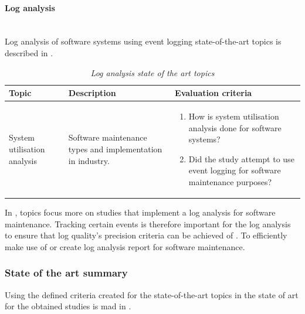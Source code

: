 \clearpage

\paragraph{Log analysis} \leavevmode\\
Log analysis of software systems using event logging state-of-the-art topics is described in .

\begin{table}[!htb]
	\centering
	\caption[Log analysis state of the art topics]
	{\textit{Log analysis state of the art topics}}
	\label{tbl:ch1_soaLogAnalysis}
	\begin{tabularx}{\linewidth}{|l|X|X|}
		\hline \textbf{Topic}  & \textbf{Description} & \textbf{Evaluation criteria}\\
		\hline System utilisation analysis & \RaggedRight Software maintenance types and implementation in industry. & \RaggedRight \begin{enumerate}
			\item How is system utilisation analysis done for software systems?
			\item Did the study attempt to use event logging for software maintenance purposes?
		\end{enumerate} \\
		\hline
	\end{tabularx}
\end{table}

In , topics focus more on studies that implement a log analysis for software maintenance. Tracking certain events is therefore important for the log analysis to ensure that log quality's precision criteria can be achieved of . To efficiently make use of or create log analysis report for software maintenance.

\subsubsection{State of the art summary}
Using the defined criteria created for the state-of-the-art topics in  the state of art for the obtained studies is mad in .

